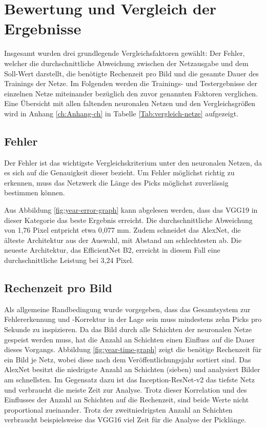 \section{Bewertung und Vergleich der Ergebnisse}
Insgesamt wurden drei grundlegende Vergleichsfaktoren gewählt: Der Fehler, welcher die durchschnittliche Abweichung zwischen der Netzausgabe und dem Soll-Wert darstellt, die benötigte Rechenzeit pro Bild und die gesamte Dauer des Trainings der Netze. Im Folgenden werden die Trainings- und Testergebnisse der einzelnen Netze miteinander bezüglich den zuvor genannten Faktoren verglichen. Eine Übersicht mit allen faltenden neuronalen Netzen und den Vergleichsgrößen wird in Anhang \ref{ch:Anhang-ch} in Tabelle \ref{Tab:vergleich-netze} aufgezeigt. 


\subsection{Fehler}\label{sec:fehler-sec}
Der Fehler ist das wichtigste Vergleichskriterium unter den neuronalen Netzen, da es sich auf die Genauigkeit dieser bezieht. Um Fehler möglichst richtig zu erkennen, muss das Netzwerk die Länge des Picks möglichst zuverlässig bestimmen können. 

\mypar Aus Abbildung \ref{fig:year-error-graph} kann abgelesen werden, dass das VGG19 in dieser Kategorie das beste Ergebnis erreicht. Die durchschnittliche Abweichung von 1,76 Pixel entpricht etwa 0,077 mm. Zudem schneidet das AlexNet, die älteste Architektur aus der Auswahl, mit Abstand am schlechtesten ab. Die neueste Architektur, das EfficientNet B2, erreicht in diesem Fall eine durchschnittliche Leistung bei 3,24 Pixel.


\subsection{Rechenzeit pro Bild}\label{sec:rechenzeit-label}
Als allgemeine Randbedingung wurde vorgegeben, dass das Gesamtsystem zur Fehlererkennung und -Korrektur in der Lage sein muss mindestens zehn Picks pro Sekunde zu inspizieren. Da das Bild durch alle Schichten der neuronalen Netze gespeist werden muss, hat die Anzahl an Schichten einen Einfluss auf die Dauer dieses Vorgangs. Abbildung \ref{fig:year-time-graph} zeigt die benötige Rechenzeit für ein Bild je Netz, wobei diese nach dem Veröffentlichungsjahr sortiert sind. Das AlexNet besitzt die niedrigste Anzahl an Schichten (sieben) und analysiert Bilder am schnellsten. Im Gegensatz dazu ist das Inception-ResNet-v2 das tiefste Netz und verbraucht die meiste Zeit zur Analyse. Trotz dieser Korrelation und des Einflusses der Anzahl an Schichten auf die Rechenzeit, sind beide Werte nicht proportional zueinander. Trotz der zweitniedrigsten Anzahl an Schichten verbraucht beispielsweise das VGG16 viel Zeit für die Analyse der Picklänge.

